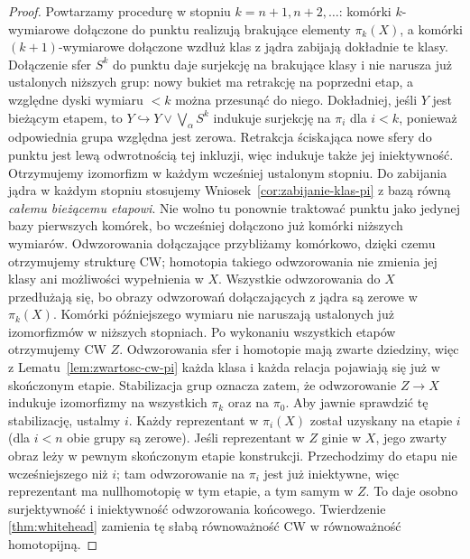 \begin{proof}
Powtarzamy procedurę
w stopniu $k=n+1,n+2,\ldots$:
komórki $k$-wymiarowe
dołączone do punktu
realizują brakujące
elementy $\pi_k(X)$,
a komórki $(k+1)$-wymiarowe
dołączone wzdłuż klas
z jądra zabijają
dokładnie te klasy.
Dołączenie sfer $S^k$ do punktu daje surjekcję na brakujące klasy
i nie narusza już ustalonych niższych grup: nowy bukiet ma retrakcję
na poprzedni etap, a względne dyski wymiaru $<k$ można przesunąć do niego.
Dokładniej, jeśli $Y$ jest bieżącym etapem, to
$Y\hookrightarrow Y\vee\bigvee_\alpha S^k$ indukuje surjekcję
na $\pi_i$ dla $i<k$, ponieważ odpowiednia grupa względna jest zerowa.
Retrakcja ściskająca nowe sfery do punktu jest lewą odwrotnością
tej inkluzji, więc indukuje także jej iniektywność. Otrzymujemy
izomorfizm w każdym wcześniej ustalonym stopniu.
Do zabijania jądra w każdym stopniu stosujemy
Wniosek~\ref{cor:zabijanie-klas-pi} z bazą równą \emph{całemu bieżącemu etapowi}.
Nie wolno tu ponownie traktować punktu jako jedynej bazy pierwszych komórek,
bo wcześniej dołączono już komórki niższych wymiarów.
Odwzorowania dołączające przybliżamy komórkowo, dzięki czemu otrzymujemy strukturę CW;
homotopia takiego odwzorowania nie zmienia jej klasy ani możliwości wypełnienia w $X$.
Wszystkie odwzorowania do $X$ przedłużają się,
bo obrazy odwzorowań
dołączających z jądra
są zerowe w $\pi_k(X)$.
Komórki późniejszego
wymiaru nie naruszają
ustalonych już
izomorfizmów w
niższych stopniach.
Po wykonaniu
wszystkich etapów otrzymujemy CW $Z$.
Odwzorowania sfer i homotopie mają zwarte dziedziny, więc z Lematu~\ref{lem:zwartosc-cw-pi}
każda klasa i każda relacja pojawiają się już w skończonym etapie.
Stabilizacja grup oznacza zatem, że odwzorowanie $Z\to X$
indukuje izomorfizmy
na wszystkich
$\pi_k$ oraz na
$\pi_0$. Aby jawnie sprawdzić tę stabilizację, ustalmy $i$.
Każdy reprezentant w $\pi_i(X)$ został uzyskany na etapie $i$
(dla $i<n$ obie grupy są zerowe). Jeśli reprezentant w $Z$
ginie w $X$, jego zwarty obraz leży w pewnym skończonym etapie
konstrukcji. Przechodzimy do etapu nie wcześniejszego niż $i$;
tam odwzorowanie na $\pi_i$ jest już iniektywne, więc reprezentant
ma nullhomotopię w tym etapie, a tym samym w $Z$.
To daje osobno surjektywność i iniektywność odwzorowania końcowego.
Twierdzenie
\ref{thm:whitehead}
zamienia tę słabą
równoważność CW
w równoważność
homotopijną.
\end{proof}

